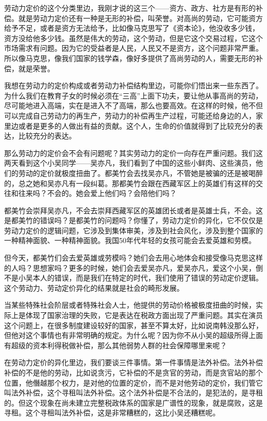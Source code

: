 \documentclass[UTF8, 12pt, a4paper]{ctexrep}
\begin{document}
劳动力定价的这个分类里边，我刚才说的这三个——资方、政方、社方是有形的补偿。就是劳动力定价还有一种是无形的补偿，叫荣誉。对高尚的劳动，它可能资方给予不足，或者是资方无法给予，比如像马克思写了《资本论》，他没收多少钱，资方没给他多少钱。虽然是伟大的劳动，这个劳动，但是它这个交易过程，它这个市场需求有问题。因为它的受益者是人民，人民又不是资方，这个问题非常严重。所以像马克思，像我们国家的钱学森，像好多提供了高尚劳动的人，需要无形的补偿，就是荣誉。

我想在劳动力的定价构成或者劳动力补偿结构里边，可能你们悟出来一些东西了。为什么我们在教育子女的时候必须在“三高”上面下功夫，要让他从事高尚的劳动，尽可能地进入高端，实在是进入不了高端，那么也要高效。在这样的时候，他不但可以完成自己劳动力的再生产，劳动力的补偿再生产过程，可能还给身边的人，家里边或者是更多的人做出有益的贡献。这个人，生命的价值就得到了比较充分的表达，比较充分的表达。

那么劳动力的定价会不会有问题呢？其实劳动力的定价一向存在严重问题。我们这两天看到这个小吴同学——吴亦凡，我们看到了中国的这些小鲜肉、这些演员，他们的劳动的定价就极度扭曲了。都美竹会去找吴亦凡，不管她是被骗的还是被喝醉的，总之她和吴亦凡有一段纠葛。那都美竹会跟在西藏军区上的英雄们有这样的交往和往来吗？不会的。她会爱上他们吗？会陪他们吗？

都美竹会崇拜吴亦凡，不会去崇拜西藏军区的英雄团长或者是英雄士兵，不会。这是都美竹的错误吗？是都美竹的问题吗？你懂了，劳动力定价的异化，它不仅仅是劳动力定价的逻辑问题，它涉及到集体审美，涉及到社会风化，涉及到整个国家的一种精神面貌、一种精神面貌。我国50年代年轻的女孩可能会去爱英雄和劳模。

但今天，都美竹们会去爱英雄或劳模吗？她们会去用心地体会和接受像马克思这样的人吗？思想家吗？更多的时候，她们会去爱吴亦凡，爱吴亦凡，爱这个小吴，倒不是小吴本人的错误，而是我们在特定的时代，我们使用了错误的劳动定价逻辑。这个劳动力、劳动定价异化的结果就是社会的畸形发展。

当某些特殊社会阶层或者特殊社会人士，他提供的劳动价格被极度扭曲的时候，实际上是体现了国家治理的失败，它是表达在税政方面出现了严重问题。其实在演员这个问题上，在很多制度建设较好的国家，甚至不算太好，比如说南韩没那么好，但他对这个事情也有非常明确的规定。为什么呢？因为你不从小吴的超级所得上面有超级的资本利得税做补偿，那么其他弱势人群的社会保障哪里来呢？

在劳动力定价的异化里边，我们要谈三件事情。第一件事情是法外补偿。法外补偿补偿的不是他的劳动，比如说贪污，它补偿的不是贪官的劳动，而是贪官站的那个位置，他僭越那个权力，是对他的位置的定价，而不是对他劳动的定价，我们管它叫法外补偿，这个寻租叫法外补偿。这个法外补偿是不合法的，是犯法的，是寻租的。但这个现象在尚未建立完整税政体系的国家是广谱性的现象，就是腐败，这是寻租。这个寻租叫法外补偿，这是非常糟糕的，这比小吴还糟糕呢。
\end{document}

